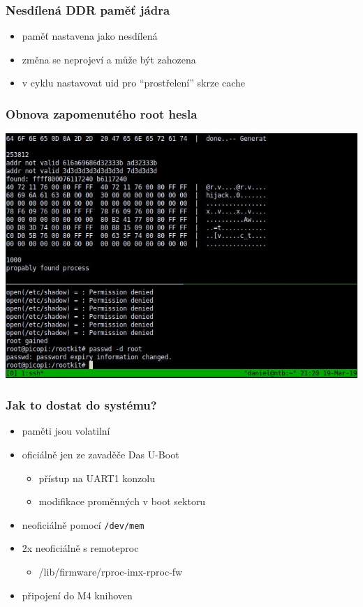 \documentclass{beamer}
\begin{document}
\begin{frame}
\frametitle{Nesdílená DDR paměť jádra}
\begin{itemize}
	\item paměť nastavena jako nesdílená
	\item změna se neprojeví a může být zahozena
	\item v cyklu nastavovat uid pro ``prostřelení'' skrze cache
\end{itemize}
\end{frame}

\begin{frame}
\frametitle{Obnova zapomenutého root hesla}
\includegraphics[width=\linewidth]{figures/demo.jpg}
\end{frame}




\begin{frame}
\frametitle{Jak to dostat do systému?}
\begin{itemize}
	\item paměti jsou volatilní
	\item oficiálně jen ze zavaděče Das U-Boot
		\begin{itemize}
			\item přístup na UART1 konzolu
			\item modifikace proměnných v boot sektoru
		\end{itemize}
	\item neoficiálně pomocí \texttt{/dev/mem}
	\item 2x neoficiálně s remoteproc
		\begin{itemize}
			\item /lib/firmware/rproc-imx-rproc-fw
		\end{itemize}
	\item připojení do M4 knihoven
\end{itemize}
\end{frame}
\end{document}
